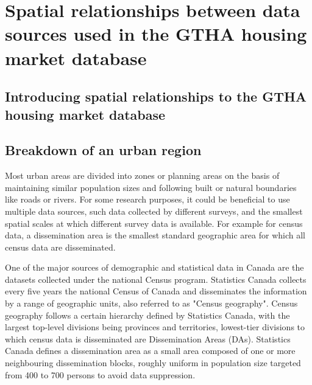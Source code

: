 \chapter{Spatial relationships between data sources used in the GTHA housing market database} \label{ch:spatial_relationships}

\section{Introducing spatial relationships to the GTHA housing market database} \label{sec:intro_spatial_relationships}


\section{Breakdown of an urban region} \label{sec:breakdown_of_urban_region}

Most urban areas are divided into zones or planning areas on the basis of maintaining similar population sizes and following built or natural boundaries like roads or rivers.
For some research purposes, it could be beneficial to use multiple data sources, such data collected by different surveys, and the smallest spatial scales at which different survey data is available.
For example for census data, a dissemination area is the smallest standard geographic area for which all census data are disseminated.

One of the major sources of demographic and statistical data in Canada are the datasets collected under the national Census program.
Statistics Canada collects every five years the national Census of Canada and disseminates the information by a range of geographic units, also referred to as "Census geography"\cite{MapandDataLibrary2019}.
Census geography follows a certain hierarchy defined by Statistics Canada, with the largest top-level divisions being provinces and territories, lowest-tier divisions to which census data is disseminated are Dissemination Areas (DAs)\cite{StatisticsCanada2018}.
Statistics Canada defines a dissemination area as a small area composed of one or more neighbouring dissemination blocks, roughly uniform in population size targeted from 400 to 700 persons to avoid data suppression\cite{StatisticsCanada2015}.


